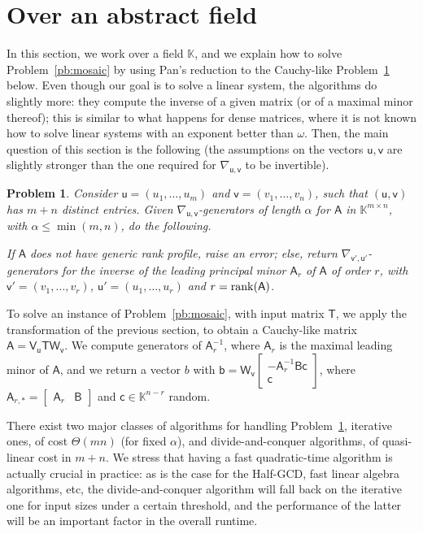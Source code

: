 \documentclass[sigconf]{acmart}
\newcommand{\vb}{\ensuremath{\mathsf{b}}}
\newcommand{\vc}{\ensuremath{\mathsf{c}}}
\newcommand{\vu}{\ensuremath{\mathsf{u}}}
\newcommand{\vv}{\ensuremath{\mathsf{v}}}
\newcommand{\mA}{\ensuremath{\mathsf{A}}}
\newcommand{\mB}{\ensuremath{\mathsf{B}}}
\newcommand{\mT}{\ensuremath{\mathsf{T}}}
\newcommand{\mV}{\ensuremath{\mathsf{V}}}
\newcommand{\mW}{\ensuremath{\mathsf{W}}}
\newcommand{\K}{\ensuremath{\mathbb{K}}}
\newtheorem{pbm}{Problem}
\theoremstyle{acmdefinition}
\begin{document}
\section{Over an abstract field}\label{sec:abstract}

In this section, we work over a field $\K$, and we explain how to
solve Problem~\ref{pb:mosaic} by using Pan's reduction to the
Cauchy-like Problem~\ref{pb:cauchy} below. Even though our goal is to
solve a linear system, the algorithms do slightly more: they compute
the inverse of a given matrix (or of a maximal minor thereof); this is
similar to what happens for dense matrices, where it is not known how
to solve linear systems with an exponent better than $\omega$.
Then, the main question of this section is the following (the
assumptions on the vectors $\vu,\vv$ are slightly stronger than the
one required for $\nabla_{\vu,\vv}$ to be invertible). 
%
\begin{pbm}\label{pb:cauchy}
  Consider $\vu=(u_1,\dots,u_m)$ and $\vv=(v_1,\dots,v_n)$,
  such that $(\vu,\vv)$ has $m+n$ distinct entries. Given
  $\nabla_{\vu,\vv}$-generators of length $\alpha$ for $\mA$
  in $\K^{m \times n}$, with $\alpha \le \min(m,n)$, do the following.

  If $\mA$ does not have generic rank profile, raise an error;
  else, return $\nabla_{\vv',\vu'}$-generators for the inverse
    of the leading principal minor $\mA_r$ of $\mA$ of order $r$, with
    $\vv'=(v_1,\dots,v_r)$, $\vu'=(u_1,\dots,u_r)$ and
    $r={\rm rank}(\mA)$.
\end{pbm}
%
To solve an instance of Problem~\ref{pb:mosaic}, with input matrix
$\mT$, we apply the transformation of the previous section, to obtain
a Cauchy-like matrix $\mA = \mV_\vu \mT \mW_{\vv}$. We compute
generators of $\mA_{r}^{-1}$, where $\mA_r$ is the maximal leading minor
of $\mA$, and we return a vector $b$ with
$\vb=\mW_{\vv}
\left[\begin{smallmatrix} 
-\mA_r^{-1}  \mB \vc \\ 
\vc
\end{smallmatrix}\right]$,
where 
%
$\mA_{r,\ast}=\begin{bmatrix}
    \mA_r & \mB
  \end{bmatrix}$ 
and $\vc \in \K^{n-r}$ random.

There exist two major classes of algorithms for handling
Problem~\ref{pb:cauchy}, iterative ones, of cost  $\Theta(mn)$
(for fixed $\alpha$), and  divide-and-conquer
algorithms, of quasi-linear cost in $m+n$. We stress that having a
fast quadratic-time algorithm is actually crucial in practice: as is
the case for the Half-GCD, fast linear algebra algorithms, etc, the
divide-and-conquer  algorithm will fall back on the iterative one for input
sizes under a certain threshold, and the performance of the latter
will be an important factor in the overall runtime.
\end{document}
